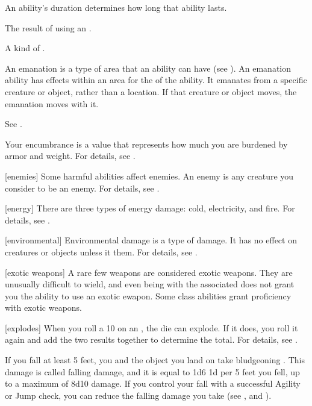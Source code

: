  An ability's duration determines how long that ability lasts.

 The result of using an .

 A kind of .

 An emanation is a type of area that an ability can have (see ).
An emanation ability has effects within an area for the  of the ability.
It emanates from a specific creature or object, rather than a location.
If that creature or object moves, the emanation moves with it.

 See .

 Your encumbrance is a value that represents how much you are burdened by armor and weight.
For details, see .

[enemies] Some harmful abilities affect enemies.
An enemy is any creature you consider to be an enemy.
For details, see .

[energy] There are three types of energy damage: cold, electricity, and fire.
For details, see .

[environmental] Environmental damage is a type of damage.
It has no effect on creatures or objects unless it  them.
For details, see .

[exotic weapons] A rare few weapons are considered exotic weapons.
They are unusually difficult to wield, and even being  with the associated  does not grant you the ability to use an exotic ewapon.
Some class abilities grant proficiency with exotic weapons.

[explodes] When you roll a 10 on an , the die can explode.
If it does, you roll it again and add the two results together to determine the total.
For details, see .

 If you fall at least 5 feet, you and the object you land on take bludgeoning .
This damage is called falling damage, and it is equal to 1d6 \add 1d per 5 feet you fell, up to a maximum of 8d10 damage.
If you control your fall with a successful Agility or Jump check, you can reduce the falling damage you take (see , and ).

